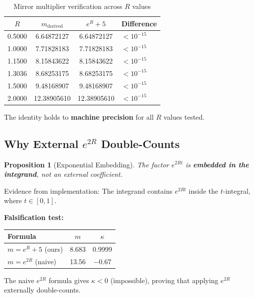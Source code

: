 \documentclass[11pt]{article}
\newtheorem{proposition}{Proposition}
\begin{document}
\begin{table}[h]
\centering
\caption{Mirror multiplier verification across $R$ values}
\begin{tabular}{cccl}
\toprule
$R$ & $m_{\text{derived}}$ & $e^R + 5$ & Difference \\
\midrule
0.5000 & 6.64872127 & 6.64872127 & $< 10^{-15}$ \\
1.0000 & 7.71828183 & 7.71828183 & $< 10^{-15}$ \\
1.1500 & 8.15843622 & 8.15843622 & $< 10^{-15}$ \\
1.3036 & 8.68253175 & 8.68253175 & $< 10^{-15}$ \\
1.5000 & 9.48168907 & 9.48168907 & $< 10^{-15}$ \\
2.0000 & 12.38905610 & 12.38905610 & $< 10^{-15}$ \\
\bottomrule
\end{tabular}
\end{table}

The identity holds to \textbf{machine precision} for all $R$ values tested.

\subsection{Why External $e^{2R}$ Double-Counts}

\begin{proposition}[Exponential Embedding]
The factor $e^{2Rt}$ is \textbf{embedded in the integrand}, not an external coefficient.
\end{proposition}

Evidence from implementation: The integrand contains $e^{2Rt}$ inside the $t$-integral, where $t \in [0,1]$.

\textbf{Falsification test:}
\begin{center}
\begin{tabular}{lcc}
\toprule
Formula & $m$ & $\kappa$ \\
\midrule
$m = e^R + 5$ (ours) & 8.683 & 0.9999 \\
$m = e^{2R}$ (naive) & 13.56 & \textcolor{signflip}{\textbf{$-0.67$}} \\
\bottomrule
\end{tabular}
\end{center}

The naive $e^{2R}$ formula gives $\kappa < 0$ (impossible), proving that applying $e^{2R}$ externally double-counts.

\end{document}

